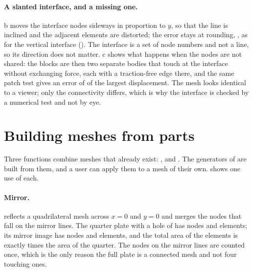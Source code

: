 \paragraph{A slanted interface, and a missing one.} b moves the interface nodes sideways in proportion to $y$, so that the line is inclined and the adjacent elements are distorted; the error stays at rounding, \cmeMBSlantErr{}, as for the vertical interface (\cmeMBVertErr{}). The interface is a set of node numbers and not a line, so its direction does not matter. c shows what happens when the nodes are not shared: the blocks are then two separate bodies that touch at the interface without exchanging force, each with a traction-free edge there, and the same patch test gives an error of \cmeMBDupErr{} of the largest displacement. The mesh looks identical to a viewer; only the connectivity differs, which is why the interface is checked by a numerical test and not by eye.


\section{Building meshes from parts}\label{sec:me-parts}

Three functions combine meshes that already exist: ,  and . The generators of  are built from them, and a user can apply them to a mesh of their own.  shows one use of each.

\paragraph{Mirror.}  reflects a quadrilateral mesh across $x=0$ and $y=0$ and merges the nodes that fall on the mirror lines. The quarter plate with a hole of  has \cmeMirQuarterNodes{} nodes and \cmeMirQuarterEl{} elements; its mirror image has \cmeMirFullNodes{} nodes and \cmeMirFullEl{} elements, and the total area of the elements is exactly \cmeMirAreaRatio{} times the area of the quarter. The nodes on the mirror lines are counted once, which is the only reason the full plate is a connected mesh and not four touching ones.

